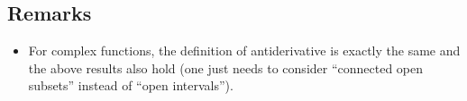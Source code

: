 \documentclass[12pt]{article}
\begin{document}
\subsection{Remarks}
\begin{itemize}
\item For complex functions, the definition of antiderivative is exactly the same and the above results also hold (one just needs to consider ``connected open subsets'' instead of ``open intervals'').
\end{itemize}
\end{document}
